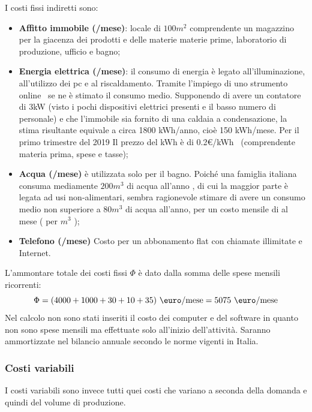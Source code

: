 %
I costi fissi indiretti sono: 
\begin{itemize}
\item \textbf{Affitto immobile (/mese)}: locale di $100 m^2$
comprendente un magazzino per la giacenza dei prodotti e delle materie materie
prime, laboratorio di produzione, ufficio e bagno;
\item \textbf{Energia elettrica (/mese)}: il consumo di energia è
legato all’illuminazione, all’utilizzo dei pc e al riscaldamento. Tramite
l’impiego di uno strumento online~\cite{lucegas} se ne è stimato il consumo
medio. Supponendo di avere un contatore di 3kW (visto i pochi dispositivi
elettrici presenti e il basso numero di personale) e che l’immobile sia fornito
di una caldaia a condensazione, la stima risultante equivale a circa 1800
kWh/anno, cioè 150 kWh/mese. Per il primo trimestre del 2019 Il prezzo del kWh è
di 0.2\euro/kWh~\cite{segugio} (comprendente materia prima, spese e tasse);

\item \textbf{Acqua (/mese)}  è utilizzata solo per il bagno. Poiché una
famiglia italiana consuma mediamente $200 m^3$ di acqua all’anno \cite{acqua},
di cui la maggior parte è legata ad usi non-alimentari, sembra ragionevole
stimare di avere un consumo medio non superiore a $80 m^3$ di acqua all’anno,
per un costo mensile di  al mese ( per $m^3$ \cite{acquacub});

\item \textbf{Telefono (/mese)} Costo per un abbonamento flat \cite{tim}
con chiamate illimitate e Internet.

\end{itemize}
%

L’ammontare totale dei costi fissi $\Phi$ è dato dalla somma delle spese mensili
ricorrenti:
\begin{displaymath}
\Phi = (4000 + 1000 + 30 + 10 + 35) \ \mbox{\euro/mese} = 5075 \ 
\mbox{\euro/mese}
\end{displaymath}
Nel calcolo non sono stati inseriti il costo dei computer e del software in
quanto non sono spese mensili ma effettuate solo all’inizio dell’attività.
Saranno ammortizzate nel bilancio annuale secondo le norme vigenti in Italia.
%
\subsubsection{Costi variabili}
I costi variabili sono invece tutti quei costi che variano a seconda della
domanda e quindi del volume di produzione.

